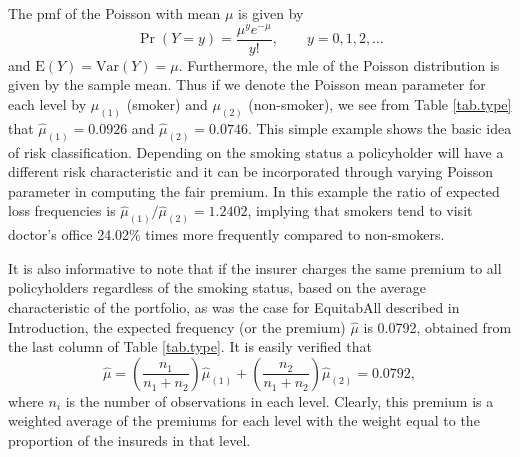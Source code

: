 \documentclass[12pt]{article}
\def\E{\mathrm{E}}
\def\Var{\mathrm{Var}}
\begin{document}
 The pmf of the Poisson with mean $\mu$ is given by
\begin{equation}
\label{Pois.pmf}
\Pr(Y=y)=\frac{\mu^y e^{-\mu}}{y!},\qquad y=0,1,2, \ldots
\end{equation} and $\E(Y)=\Var(Y)=\mu$. Furthermore, the mle of the Poisson distribution is given by the sample mean. Thus if we denote the Poisson mean parameter for each level by $\mu_{(1)}$ (smoker) and $\mu_{(2)}$ (non-smoker), we see from  Table \ref{tab.type}  that $\hat{\mu}_{(1)}=0.0926$ and $\hat{\mu}_{(2)}=0.0746$. This simple example shows the basic idea of risk classification. Depending on the smoking status a policyholder will have a different risk characteristic and it can be incorporated through varying Poisson parameter in computing the fair premium. In this example the ratio of expected loss frequencies is $\hat{\mu}_{(1)}/\hat{\mu}_{(2)}=1.2402$, implying that smokers tend to visit doctor's office 24.02\% times more frequently compared to non-smokers.

It is also informative to note that if the insurer charges the same premium to all policyholders regardless of the smoking status, based on the average characteristic of the portfolio, as was the case for EquitabAll described in Introduction, the expected frequency (or the premium) $\hat{\mu}$ is 0.0792, obtained from the last column of Table \ref{tab.type}. It is easily verified that
\begin{equation}
\label{coll.prem.avg}
\hat{\mu} = \left(\frac{n_1}{n_1+n_2}\right)\hat{\mu}_{(1)}+\left(\frac{n_2}{n_1+n_2}\right)\hat{\mu}_{(2)}=0.0792,
\end{equation} where $n_i$ is the number of observations in each level. Clearly, this premium is a weighted average of the premiums for each level with the weight equal to the proportion of the insureds in that level.\\
\end{document}
